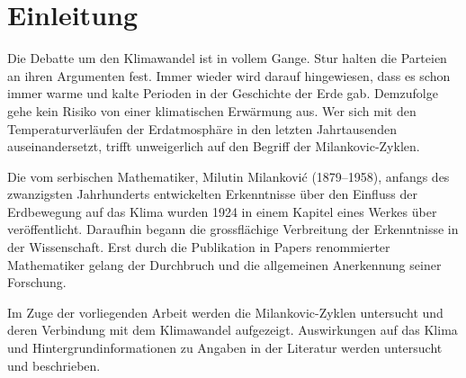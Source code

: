 %
%
%
%
\section{Einleitung\label{milankovic:section:Einleitung}}

Die Debatte um den Klimawandel ist in vollem Gange.
Stur halten die Parteien an ihren Argumenten fest.
Immer wieder wird darauf hingewiesen, dass es schon immer warme und kalte Perioden in der Geschichte der Erde gab.
Demzufolge gehe kein Risiko von einer klimatischen Erwärmung aus.
Wer sich mit den Temperaturverläufen der Erdatmosphäre in den letzten Jahrtausenden auseinandersetzt, trifft unweigerlich auf den Begriff der Milankovic-Zyklen.

Die vom serbischen Mathematiker, Milutin Milankovi\'c (1879--1958), anfangs des zwanzigsten Jahrhunderts entwickelten Erkenntnisse über den Einfluss der Erdbewegung auf das Klima wurden 1924 in einem Kapitel eines Werkes über \cite{milankovic:Klimate der geologischen Vorzeit} veröffentlicht.
Daraufhin begann die grossflächige Verbreitung der Erkenntnisse in der Wissenschaft.
Erst durch die Publikation in Papers renommierter Mathematiker gelang der Durchbruch und die allgemeinen Anerkennung seiner Forschung.

Im Zuge der vorliegenden Arbeit werden die Milankovic-Zyklen untersucht und deren Verbindung mit dem Klimawandel aufgezeigt. Auswirkungen auf das Klima und Hintergrundinformationen zu Angaben in der Literatur werden untersucht und beschrieben.



